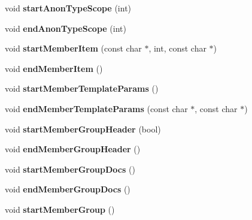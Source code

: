 \begin{DoxyCompactItemize}
\mbox{\label{class_man_generator_a7650162849d46081499953d5a16b6bbf}} 
void {\bfseries start\+Anon\+Type\+Scope} (int)
\item 
\mbox{\label{class_man_generator_a680b0b24f66dc9038bb9d97dede6c309}} 
void {\bfseries end\+Anon\+Type\+Scope} (int)
\item 
\mbox{\label{class_man_generator_a6a562eabf8ab73b8a9fd0790b441e15c}} 
void {\bfseries start\+Member\+Item} (const char $\ast$, int, const char $\ast$)
\item 
\mbox{\label{class_man_generator_a0bf54b0520a592a870ae4d310c4890b2}} 
void {\bfseries end\+Member\+Item} ()
\item 
\mbox{\label{class_man_generator_ad67219f83aa99539fc34e2142a734811}} 
void {\bfseries start\+Member\+Template\+Params} ()
\item 
\mbox{\label{class_man_generator_a0fdb9af50bb49e0451dfbff090410358}} 
void {\bfseries end\+Member\+Template\+Params} (const char $\ast$, const char $\ast$)
\item 
\mbox{\label{class_man_generator_ad61671374ab1bf2fe21d21b7589330c0}} 
void {\bfseries start\+Member\+Group\+Header} (bool)
\item 
\mbox{\label{class_man_generator_af4486862ca19909c0ae2489e0343673d}} 
void {\bfseries end\+Member\+Group\+Header} ()
\item 
\mbox{\label{class_man_generator_a66ae1d09997555850f799cd41639939e}} 
void {\bfseries start\+Member\+Group\+Docs} ()
\item 
\mbox{\label{class_man_generator_a60f94edabac05693a5c536c90ef45aaa}} 
void {\bfseries end\+Member\+Group\+Docs} ()
\item 
\mbox{\label{class_man_generator_a5e1024895e01040f9f207aa96d838998}} 
void {\bfseries start\+Member\+Group} ()
\item 

\end{DoxyCompactItemize}
